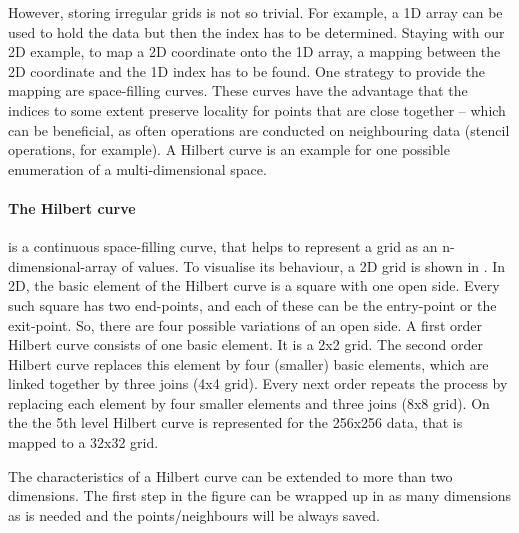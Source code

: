 However, storing irregular grids is not so trivial.
For example, a 1D array can be used to hold the data but then the index has to be determined.
Staying with our 2D example, to map a 2D coordinate onto the 1D array, a mapping between the 2D coordinate and the 1D index has to be found.
One strategy to provide the mapping are space-filling curves.
These curves have the advantage that the indices to some extent preserve locality for points that are  close together -- which can be beneficial, as often operations are conducted on neighbouring data (stencil operations, for example).
A Hilbert curve is an example for one possible enumeration of a multi-dimensional space.

\paragraph{The Hilbert curve}
is a continuous space-filling curve, that helps to represent a grid as an n-dimensional-array of values.
To visualise its behaviour, a 2D grid is shown in .
In 2D, the basic element of the Hilbert curve is a square with one open side.
Every such square has two end-points, and each of these can be the entry-point or the exit-point.
So, there are four possible variations of an open side.
A first order Hilbert curve consists of one basic element.
It is a 2x2 grid.
The second order Hilbert curve replaces this element by four (smaller) basic elements, which are linked together by three joins (4x4 grid).
Every next order repeats the process by replacing each element by four smaller elements and three joins (8x8 grid).
On the  the 5th level Hilbert curve is represented for the 256x256 data, that is mapped to a 32x32 grid.

The characteristics of a Hilbert curve can be extended to more than two dimensions.
The first step in the figure can be wrapped up in as many dimensions as is needed and the points/neighbours will be always saved.


